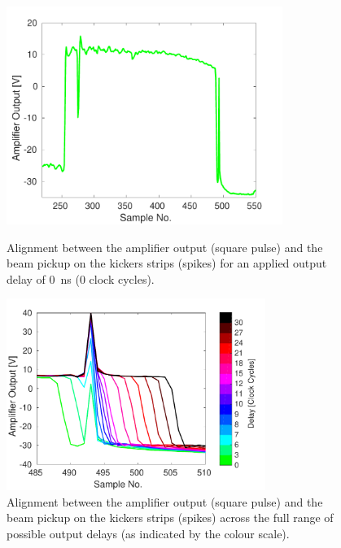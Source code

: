 \begin{figure}
  \centering
  \includegraphics[width=0.8\textwidth]{Figures/commissioning/absDelay0_all}
  \caption{Alignment between the amplifier output (square pulse) and the beam pickup on the kickers strips (spikes) for an applied output delay of 0~ns (0 clock cycles).}
  \label{f:absDelay0_all}
  \includegraphics[width=0.75\textwidth]{Figures/commissioning/absDelayAll_endPulse}
  \caption{Alignment between the amplifier output (square pulse) and the beam pickup on the kickers strips (spikes) across the full range of possible output delays (as indicated by the colour scale).}
  \label{f:absDelayAll_endPulse}
\end{figure}

